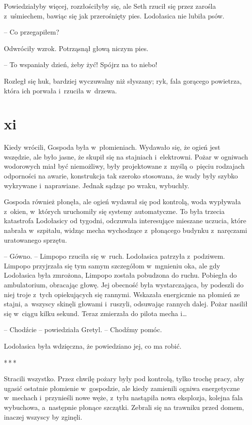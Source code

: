 \documentclass[oneside,polish,11pt,sfheadings]{mwbk}
\newcommand{\threeast}{\bigskip\par\centerline{*\,*\,*}\medskip\par}
\begin{document}
Powiedziałyby więcej, rozzłościłyby się, ale Seth rzucił się przez
zarośla z~uśmiechem, bawiąc się jak przerośnięty pies. Lodołasica nie
lubiła psów.

-- Co przegapiłem?

Odwróciły wzrok. Potrząsnął głową niczym pies. 

-- To wspaniały dzień,
żeby żyć! Spójrz na to niebo!

Rozległ się huk, bardziej wyczuwalny niż słyszany; ryk, fala gorącego
powietrza, która ich porwała i~rzuciła w~drzewa.

\chapter*{xi}

Kiedy wrócili, Gospoda była w~płomieniach. Wydawało się, że ogień jest
wszędzie, ale było jasne, że skupił się na stajniach i~elektrowni. Pożar
w ogniwach wodorowych miał być niemożliwy, były projektowane z~myślą o~pięciu rodzajach odporności na awarie, konstrukcja tak szeroko
stosowana, że wady były szybko wykrywane i~naprawiane. Jednak sądząc po
wraku, wybuchły.

Gospoda również płonęła, ale ogień wydawał się pod kontrolą, woda
wypływała z~okien, w~których uruchomiły się systemy automatyczne. To
była trzecia katastrofa Lodołasicy od tygodni, odczuwała interesujące
mieszane uczucia, które nabrała w~szpitalu, widząc mecha wychodzące z~płonącego budynku z~naręczami uratowanego sprzętu.

-- Gówno. -- Limpopo rzuciła się w~ruch. Lodołasica patrzyła z~podziwem.
Limpopo przyjrzała się tym samym szczegółom w~mgnieniu oka, ale gdy
Lodołasica była zmrożona, Limpopo została pobudzona do ruchu. Pobiegła
do ambulatorium, obracając głowę. Jej obecność była wystarczająca, by
podeszli do niej troje z~tych opiekujących się rannymi. Wskazała
energicznie na płomień ze stajni, a~wszyscy skinęli głowami i~ruszyli,
odsuwając rannych dalej. Pożar nasilił się w~ciągu kilku sekund. Teraz
zmierzała do pilota mecha i\ldots 

-- Chodźcie -- powiedziała Gretyl. -- Chodźmy pomóc.

Lodołasica była wdzięczna, że powiedziano jej, co ma robić.

\threeast

Stracili wszystko. Przez chwilę pożary były pod kontrolą, tylko trochę
pracy, aby ugasić ostatnie płomienie w~gospodzie, ale kiedy zamienili
ogniwa energetyczne w~mechach i~przynieśli nowe węże, z~tyłu nastąpiła
nowa eksplozja, kolejna fala wybuchowa, a~następnie płonące szczątki.
Zebrali się na trawniku przed domem, inaczej wszyscy by zginęli.
\end{document}
